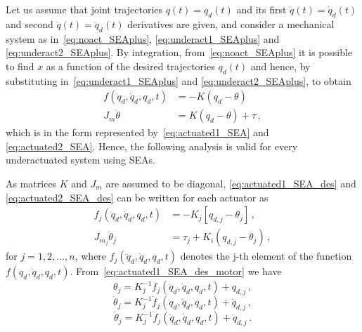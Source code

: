 Let us assume that joint trajectories $q(t)=q_d(t)$ and its first $\dot q(t)=\dot q_d(t)$ and second $\ddot q(t)=\ddot q_d(t)$ derivatives are given, and consider a mechanical system as in~\eqref{eq:noact_SEAplus}, \eqref{eq:underact1_SEAplus} and \eqref{eq:underact2_SEAplus}. By integration, from~\eqref{eq:noact_SEAplus} it is possible to find $x$ as a function of the desired trajectories $q_d(t)$ and hence, by substituting in~\eqref{eq:underact1_SEAplus} and \eqref{eq:underact2_SEAplus}, to obtain
\begin{align}
\label{eq:actuated1_SEA_des}
f(\ddot{q}_d, \dot{q}_d, q_d, t) &= - K(q_d - \theta) \\
J_{m} \ddot{\theta} &= K(q_d - \theta) + \tau\,,
\label{eq:actuated2_SEA_des}
\end{align}
which is in the form represented by~\eqref{eq:actuated1_SEA} and \eqref{eq:actuated2_SEA}. Hence, the following analysis is valid for every underactuated system using SEAs.

% 
As matrices $K$ and $J_m$ are assumed to be diagonal, \eqref{eq:actuated1_SEA_des} and \eqref{eq:actuated2_SEA_des} can be written for each actuator as
\begin{align}
	\label{eq:actuated1_SEA_des_motor}
f_j(\ddot{q}_d, \dot{q}_d, q_d, t)  &= - K_j[q_{d,j} - \theta_j]\,,\\
J_{m_{j}} \ddot{\theta}_j &= \tau_j + K_i(q_{d,j}-\theta_j)\, ,
\label{eq:actuated2_SEA_des_motor}
\end{align}
for $j= 1, 2, \ldots, n$, where $f_j(\ddot{q}_d, \dot{q}_d, q_d, t)$ denotes the j-th element of the function $f(\ddot{q}_d, \dot{q}_d, q_d, t)$. From~\eqref{eq:actuated1_SEA_des_motor} we have
\begin{equation}
	\theta_j = K_j^{-1} f_j(\ddot{q}_d, \dot{q}_d, q_d, t) + q_{d,j} \, ,
	\label{eq:motor_position}
\end{equation}
\begin{equation}
	\dot{\theta}_j  = K_j^{-1} \dot{f}_j(\ddot{q}_d, \dot{q}_d, q_d, t) + \dot{q}_{d,j} \, ,
		\label{eq:motor_speed}
\end{equation}
\begin{equation}
	\ddot{\theta}_j = K_j^{-1} \ddot{f}_j(\ddot{q}_d, \dot{q}_d, q_d, t) + \ddot{q}_{d,j} \,.
		\label{eq:motor_acc}
\end{equation}

